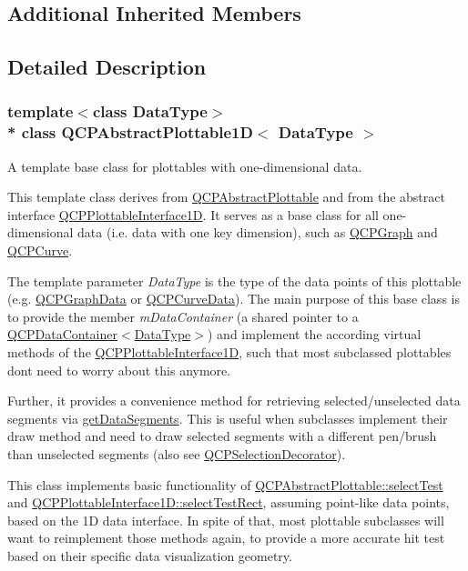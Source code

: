\subsection*{Additional Inherited Members}


\subsection{Detailed Description}
\subsubsection*{template$<$class Data\+Type$>$\\*
class Q\+C\+P\+Abstract\+Plottable1\+D$<$ Data\+Type $>$}

A template base class for plottables with one-\/dimensional data. 

This template class derives from \hyperlink{class_q_c_p_abstract_plottable}{Q\+C\+P\+Abstract\+Plottable} and from the abstract interface \hyperlink{class_q_c_p_plottable_interface1_d}{Q\+C\+P\+Plottable\+Interface1D}. It serves as a base class for all one-\/dimensional data (i.\+e. data with one key dimension), such as \hyperlink{class_q_c_p_graph}{Q\+C\+P\+Graph} and \hyperlink{class_q_c_p_curve}{Q\+C\+P\+Curve}.

The template parameter {\itshape Data\+Type} is the type of the data points of this plottable (e.\+g. \hyperlink{class_q_c_p_graph_data}{Q\+C\+P\+Graph\+Data} or \hyperlink{class_q_c_p_curve_data}{Q\+C\+P\+Curve\+Data}). The main purpose of this base class is to provide the member {\itshape m\+Data\+Container} (a shared pointer to a \hyperlink{class_q_c_p_data_container}{Q\+C\+P\+Data\+Container$<$Data\+Type$>$}) and implement the according virtual methods of the \hyperlink{class_q_c_p_plottable_interface1_d}{Q\+C\+P\+Plottable\+Interface1D}, such that most subclassed plottables don\textquotesingle{}t need to worry about this anymore.

Further, it provides a convenience method for retrieving selected/unselected data segments via \hyperlink{class_q_c_p_abstract_plottable1_d_a966cb165fb1dfc561d923dc6f8b149ea}{get\+Data\+Segments}. This is useful when subclasses implement their draw method and need to draw selected segments with a different pen/brush than unselected segments (also see \hyperlink{class_q_c_p_selection_decorator}{Q\+C\+P\+Selection\+Decorator}).

This class implements basic functionality of \hyperlink{class_q_c_p_abstract_plottable_a38efe9641d972992a3d44204bc80ec1d}{Q\+C\+P\+Abstract\+Plottable\+::select\+Test} and \hyperlink{class_q_c_p_plottable_interface1_d_a67093e4ccf490ff5f7750640941ff34c}{Q\+C\+P\+Plottable\+Interface1\+D\+::select\+Test\+Rect}, assuming point-\/like data points, based on the 1D data interface. In spite of that, most plottable subclasses will want to reimplement those methods again, to provide a more accurate hit test based on their specific data visualization geometry. 

